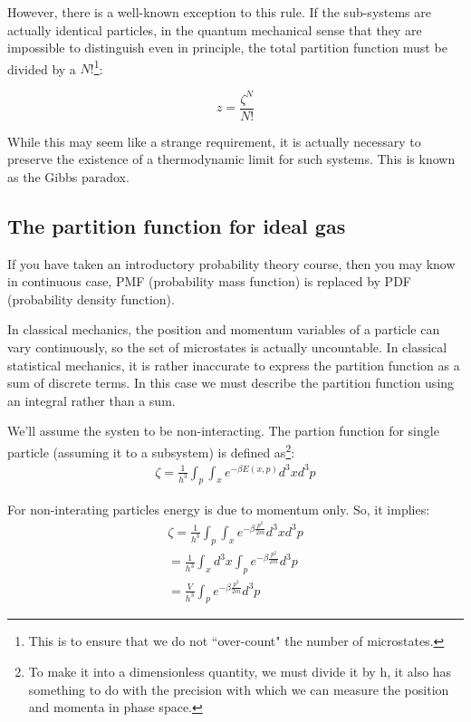 \documentclass{tufte-handout}
\begin{document}
However, there is a well-known exception to this rule. If the sub-systems 
are actually identical particles, in the quantum mechanical sense that they 
are impossible to distinguish even in principle, the total partition function 
must be divided by a \(N!\)\footnote{This is to ensure that we do not ``over-count" 
the number of microstates. }:

    \[z = \frac{\zeta^N}{N!}\]

While this may seem like a strange requirement, it is actually necessary 
to preserve the existence of a thermodynamic limit for such systems. 
This is known as the Gibbs paradox.
\subsection{The partition function for ideal gas}

If you have taken an introductory probability theory course, then you may know in continuous 
case, PMF (probability mass function) is replaced by PDF (probability density function). 

In classical mechanics, the position and momentum variables of a particle can vary continuously, 
so the set of microstates is actually uncountable. In classical statistical mechanics, it is 
rather inaccurate to express the partition function as a sum of discrete terms. 
In this case we must describe the partition function using an integral rather than a sum.

We'll assume the systen to be non-interacting. 
The partion function for single particle (assuming it to a subsystem) is defined as\footnote{
	To make it into a dimensionless quantity, we must divide it by h, it also has something to do with 
	the precision with which we can measure the position and momenta in phase space.
}:
\[\begin{gathered}
	\zeta = \frac{1}{h^3}\int_p \int_x e^{-\beta E(x, p)} d^3x d^3p
\end{gathered}\]

For non-interating particles energy is due to momentum only. So, it implies:
\[\begin{gathered}
	\zeta = \frac{1}{h^3}\int_p \int_x e^{-\beta \frac{p^2}{2m}} d^3x d^3p\\
	 = \frac{1}{h^3} \int_x d^3 x \int_p e^{-\beta \frac{p^2}{2m}}d^3p\\
	 = \frac{V}{h^3}  \int_p e^{-\beta \frac{p^2}{2m}}d^3p \tag*{a}
\end{gathered}\]
\end{document}
